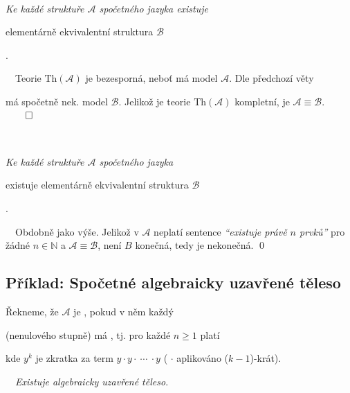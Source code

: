 {\bf {}}\ \ {\it Ke každé struktuře $\mathcal{A}$ spočetného jazyka  existuje
\smallskip

 elementárně ekvivalentní struktura $\mathcal{B}$}.
\medskip

{\it {}}\ \ Teorie $\mathrm{Th}(\mathcal{A})$ je bezesporná, neboť má model $\mathcal{A}$. Dle předchozí věty
\smallskip

má spočetně nek. model $\mathcal{B}$. Jelikož je teorie $\mathrm{Th}(\mathcal{A})$ kompletní, je $\mathcal{A}\equiv \mathcal{B}$. $\qed$
\bigskip

{\bf {}}\ \ {\it Ke každé  struktuře $\mathcal{A}$ spočetného jazyka 
\smallskip

existuje  elementárně ekvivalentní struktura $\mathcal{B}$}.
\medskip

{\it {}}\ \ Obdobně jako výše. Jelikož v $\mathcal{A}$ neplatí sentence \emph{``existuje právě $n$
prvků''} pro žádné $n \in \mathbb{N}$ a $\mathcal{A}\equiv \mathcal{B}$, není $B$ konečná, tedy je nekonečná. \qed

\subsection{Příklad: Spočetné algebraicky uzavřené těleso}\todo

Řekneme, že  $\mathcal{A}$ je , pokud v něm každý 
\smallskip

(nenulového stupně) má , tj. pro každé $n\ge 1$ platí
\vspace{-1mm}

\vspace{-5mm}
kde $y^k$ je zkratka za term $y\cdot y \cdot\ \dotsb\ \cdot y$ ( $\cdot$ aplikováno ($k-1$)-krát).
\bigskip

\smallskip

\bigskip

{\bf {}}\ \ {\it Existuje  algebraicky uzavřené těleso}.
\medskip


